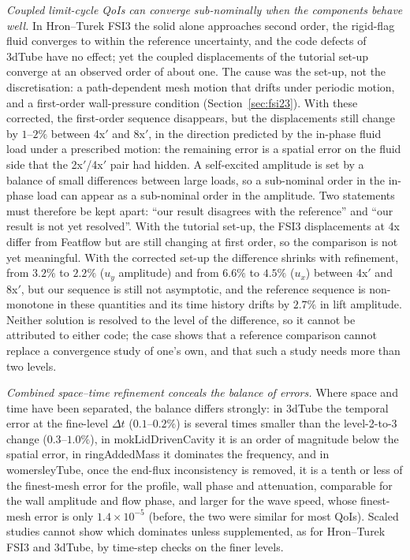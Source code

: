 \emph{Coupled limit-cycle QoIs can converge sub-nominally when the components behave well.}
In Hron--Turek FSI3 the solid alone approaches second order, the rigid-flag fluid converges to within the reference uncertainty, and the code defects of 3dTube have no effect; yet the coupled displacements of the tutorial set-up converge at an observed order of about one. The cause was the set-up, not the discretisation: a path-dependent mesh motion that drifts under periodic motion, and a first-order wall-pressure condition (Section~\ref{sec:fsi23}). With these corrected, the first-order sequence disappears, but the displacements still change by $1$--$2\%$ between 4x$'$ and 8x$'$, in the direction predicted by the in-phase fluid load under a prescribed motion: the remaining error is a spatial error on the fluid side that the 2x$'$/4x$'$ pair had hidden.
A self-excited amplitude is set by a balance of small differences between large loads, so a sub-nominal order in the in-phase load can appear as a sub-nominal order in the amplitude.
Two statements must therefore be kept apart: ``our result disagrees with the reference'' and ``our result is not yet resolved''.
With the tutorial set-up, the FSI3 displacements at 4x differ from Featflow but are still changing at first order, so the comparison is not yet meaningful. With the corrected set-up the difference shrinks with refinement, from $3.2\%$ to $2.2\%$ ($u_y$ amplitude) and from $6.6\%$ to $4.5\%$ ($u_x$) between 4x$'$ and 8x$'$, but our sequence is still not asymptotic, and the reference sequence is non-monotone in these quantities and its time history drifts by $2.7\%$ in lift amplitude. Neither solution is resolved to the level of the difference, so it cannot be attributed to either code; the case shows that a reference comparison cannot replace a convergence study of one's own, and that such a study needs more than two levels.

\emph{Combined space--time refinement conceals the balance of errors.}
Where space and time have been separated, the balance differs strongly: in 3dTube the temporal error at the fine-level $\Delta t$ ($0.1$--$0.2\%$) is several times smaller than the level-2-to-3 change ($0.3$--$1.0\%$), in mokLidDrivenCavity it is an order of magnitude below the spatial error, in ringAddedMass it dominates the frequency, and in womersleyTube, once the end-flux inconsistency is removed, it is a tenth or less of the finest-mesh error for the profile, wall phase and attenuation, comparable for the wall amplitude and flow phase, and larger for the wave speed, whose finest-mesh error is only $1.4\times10^{-5}$ (before, the two were similar for most QoIs).
Scaled studies cannot show which dominates unless supplemented, as for Hron--Turek FSI3 and 3dTube, by time-step checks on the finer levels.

